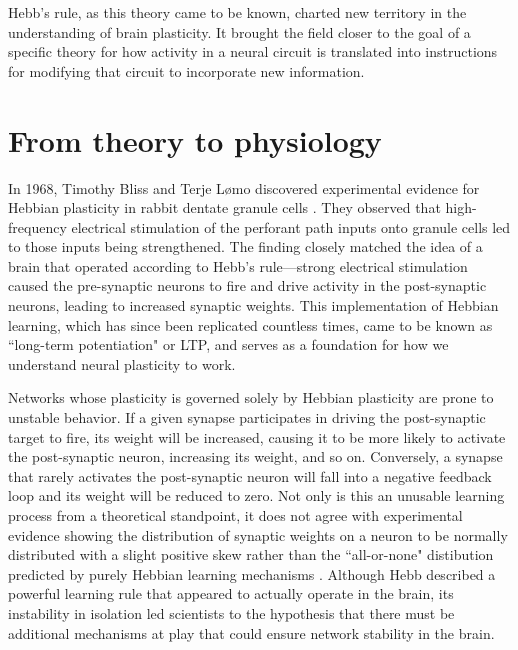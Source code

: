 Hebb's rule, as this theory came to be known, charted new territory in the understanding of brain plasticity. It brought the field closer to the goal of a specific theory for how activity in a neural circuit is translated into instructions for modifying that circuit to incorporate new information.

\section{From theory to physiology}

In 1968, Timothy Bliss and Terje L\o mo discovered experimental evidence for Hebbian plasticity in rabbit dentate granule cells \cite{Bliss1973}. They observed that high-frequency electrical stimulation of the perforant path inputs onto granule cells led to those inputs being strengthened. The finding closely matched the idea of a brain that operated according to Hebb's rule---strong electrical stimulation caused the pre-synaptic neurons to fire and drive activity in the post-synaptic neurons, leading to increased synaptic weights. This implementation of Hebbian learning, which has since been replicated countless times, came to be known as ``long-term potentiation" or LTP, and serves as a foundation for how we understand neural plasticity to work.

Networks whose plasticity is governed solely by Hebbian plasticity are prone to unstable behavior. If a given synapse participates in driving the post-synaptic target to fire, its weight will be increased, causing it to be more likely to activate the post-synaptic neuron, increasing its weight, and so on. Conversely, a synapse that rarely activates the post-synaptic neuron will fall into a negative feedback loop and its weight will be reduced to zero. Not only is this an unusable learning process from a theoretical standpoint, it does not agree with experimental evidence showing the distribution of synaptic weights on a neuron to be normally distributed with a slight positive skew rather than the ``all-or-none" distibution predicted by purely Hebbian learning mechanisms \cite{Turrigiano1998}. Although Hebb described a powerful learning rule that appeared to actually operate in the brain, its instability in isolation led scientists to the hypothesis that there must be additional mechanisms at play that could ensure network stability in the brain.

